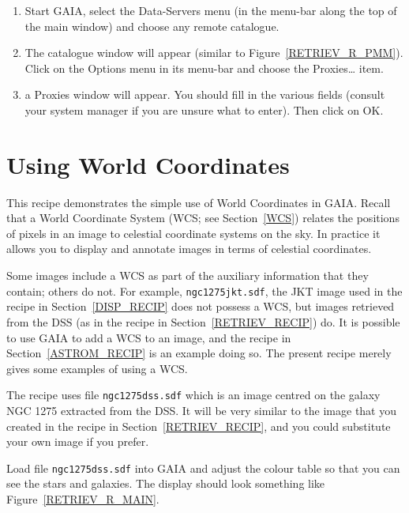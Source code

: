 \documentclass[twoside,11pt]{starlink}
\begin{document}
\begin{enumerate}

  \item Start GAIA, select the \textsf{Data-Servers} menu (in the menu-bar
   along the top of the main window) and choose any remote catalogue.

  \item The catalogue window will appear (similar to
   Figure~\ref{RETRIEV_R_PMM}).  Click on the \textsf{Options} menu in its
   menu-bar and choose the \textsf{Proxies\ldots} item.

  \item a \textsf{Proxies} window will appear.  You should fill in the various
   fields (consult your system manager if you are unsure what to enter).
   Then click on \textsf{OK}.

\end{enumerate}


\newpage
\section{\label{WCS_RECIP}Using World Coordinates}

This recipe demonstrates the simple use of World Coordinates in GAIA.
Recall that a World Coordinate System (WCS; see Section~\ref{WCS})
relates the positions of pixels in an image to celestial coordinate
systems on the sky.  In practice it allows you to display and annotate
images in terms of celestial coordinates.

Some images include a WCS as part of the auxiliary information that they
contain; others do not.  For example, \texttt{ngc1275jkt.sdf}, the JKT image
used in the recipe in Section~\ref{DISP_RECIP} does not possess a WCS,
but images retrieved from the DSS (as in the recipe in
Section~\ref{RETRIEV_RECIP}) do.  It is possible to use GAIA to add a WCS
to an image, and the recipe in Section~\ref{ASTROM_RECIP} is an example
doing so.  The present recipe merely gives some examples of using a WCS.

The recipe uses file \texttt{ngc1275dss.sdf} which is an image centred on
the galaxy NGC 1275 extracted from the DSS.  It will be very similar to
the image that you created in the recipe in Section~\ref{RETRIEV_RECIP},
and you could substitute your own image if you prefer.

Load file \texttt{ngc1275dss.sdf} into GAIA and adjust the colour table
so that you can see the stars and galaxies.  The display should look
something like Figure~\ref{RETRIEV_R_MAIN}.
\end{document}
